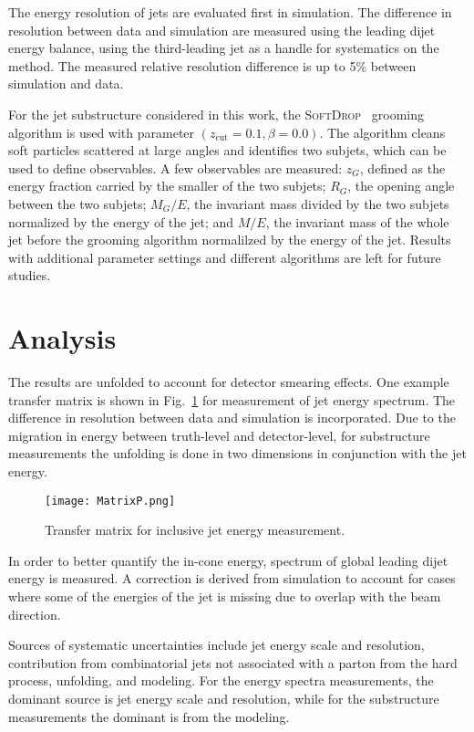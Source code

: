 \documentclass[a4paper,11pt]{article}
\begin{document}
The energy resolution of jets are evaluated first in simulation.  The difference in resolution between data and simulation are measured using the leading dijet energy balance, using the third-leading jet as a handle for systematics on the method.  The measured relative resolution difference is up to 5\% between simulation and data.

For the jet substructure considered in this work, the \textsc{SoftDrop}~\cite{Larkoski:2014wba,Dasgupta:2013ihk} grooming algorithm is used with parameter $(z_\text{cut} = 0.1, \beta = 0.0)$.  The algorithm cleans soft particles scattered at large angles and identifies two subjets, which can be used to define observables.  A few observables are measured: $z_G$, defined as the energy fraction carried by the smaller of the two subjets; $R_G$, the opening angle between the two subjets; $M_G/E$, the invariant mass divided by the two subjets normalized by the energy of the jet; and $M/E$, the invariant mass of the whole jet before the grooming algorithm normalilzed by the energy of the jet.
Results with additional parameter settings and different algorithms are left for future studies.


\section{Analysis}

The results are unfolded to account for detector smearing effects.  One example transfer matrix is shown in Fig.~\ref{Figure:EnergyAnalysis} for measurement of jet energy spectrum.  The difference in resolution between data and simulation is incorporated.  Due to the migration in energy between truth-level and detector-level, for substructure measurements the unfolding is done in two dimensions in conjunction with the jet energy.

\begin{figure}[ht!]
    \centering
    \texttt{[image: MatrixP.png]}
    \caption{Transfer matrix for inclusive jet energy measurement.}
    \label{Figure:EnergyAnalysis}
\end{figure}

In order to better quantify the in-cone energy, spectrum of global leading dijet energy is measured.  A correction is derived from simulation to account for cases where some of the energies of the jet is missing due to overlap with the beam direction.

Sources of systematic uncertainties include jet energy scale and resolution, contribution from combinatorial jets not associated with a parton from the hard process, unfolding, and modeling.  For the energy spectra measurements, the dominant source is jet energy scale and resolution, while for the substructure measurements the dominant is from the modeling.
\end{document}
